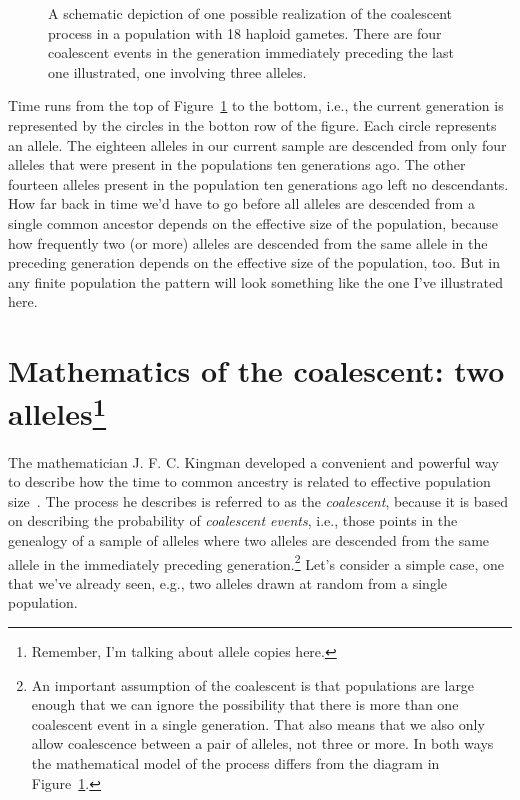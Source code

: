 \begin{figure}
\begin{center}
\end{center}
\caption{A schematic depiction of one possible realization of the
  coalescent process in a population with 18 haploid gametes. There
  are four coalescent events in the generation immediately preceding
  the last one illustrated, one involving three alleles.}\label{fig:coalescent}
\end{figure}

Time runs from the top of Figure~\ref{fig:coalescent} to the bottom,
i.e., the current generation is represented by the circles in the
botton row of the figure. Each circle represents an allele. The
eighteen alleles in our current sample are descended from only four
alleles that were present in the populations ten generations ago. The
other fourteen alleles present in the population ten generations ago
left no descendants. How far back in time we'd have to go before all
alleles are descended from a single common ancestor depends on the
effective size of the population, because how frequently two (or more)
alleles are descended from the same allele in the preceding generation
depends on the effective size of the population, too. But in any
finite population the pattern will look something like the one I've
illustrated here.

\section*{Mathematics of the coalescent: two
  alleles\footnote{Remember, I'm
  talking about allele copies here.}}

The mathematician J. F. C. Kingman developed a convenient and powerful
way to describe how the time to common ancestry is related to
effective population
size~\cite{Kingman-1982-genealogy,Kingman-1982-coalescent}. The
process he describes is referred to as the {\it coalescent}, because
it is based on describing the probability of {\it coalescent
  events}, i.e., those points in the
genealogy of a sample of alleles where two alleles are descended from
the same allele in the immediately preceding generation.\footnote{An
  important assumption of the coalescent is that populations are large
  enough that we can ignore the possibility that there is more than
  one coalescent event in a single generation. That also means that we
  also only allow coalescence between a pair of alleles, not three or
  more. In both ways the mathematical model of the process differs
  from the diagram in Figure~\ref{fig:coalescent}.}  Let's consider a
simple case, one that we've already seen, e.g., two alleles
drawn at random from a single population.

